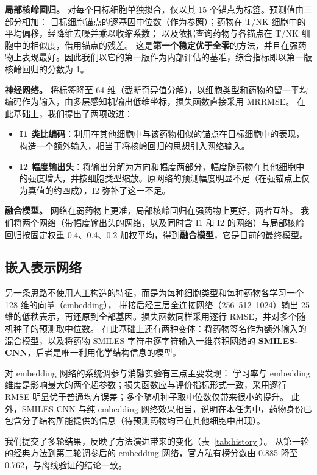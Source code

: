 \documentclass[11pt,a4paper]{article}
\begin{document}
\textbf{局部核岭回归。} 对每个目标细胞单独拟合，仅以其 15 个锚点为标签。预测值由三部分相加：
目标细胞锚点的逐基因中位数（作为参照）；药物在 T/NK 细胞中的平均偏移，经降维去噪并乘以收缩系数；
以及依据查询药物与各锚点在 T/NK 细胞中的相似度，借用锚点的残差。
这是\textbf{第一个稳定优于全零}的方法，并且在强药物上表现最好。因此我们以它的第一版作为内部评估的基准，综合指标即以第一版核岭回归的分数为 1。

\textbf{神经网络。} 将标签降至 64 维（截断奇异值分解），以细胞类型和药物的留一平均编码作为输入，由多层感知机输出低维坐标，损失函数直接采用 MRRMSE。
在此基础上，我们提出了两项改进：
\begin{itemize}
\item \textbf{I1 类比编码}：利用在其他细胞中与该药物相似的锚点在目标细胞中的表现，构造一个额外输入，相当于将核岭回归的思想引入网络输入。
\item \textbf{I2 幅度输出头}：将输出分解为方向和幅度两部分，幅度随药物在其他细胞中的强度增大，并按细胞类型缩放。原网络的预测幅度明显不足（在强锚点上仅为真值的约四成），I2 弥补了这一不足。
\end{itemize}
\textbf{融合模型。} 网络在弱药物上更准，局部核岭回归在强药物上更好，两者互补。
我们将两个网络（带幅度输出头的网络，以及同时含 I1 和 I2 的网络）与局部核岭回归按固定权重 0.4、0.4、0.2 加权平均，得到\textbf{融合模型}，它是目前的最终模型。

\subsection{嵌入表示网络}
另一条思路不使用人工构造的特征，而是为每种细胞类型和每种药物各学习一个 128 维的向量（embedding），
拼接后经三层全连接网络（256--512--1024）输出 25 维的低秩表示，再还原到全部基因。损失函数同样采用逐行 RMSE，并对多个随机种子的预测取中位数。
在此基础上还有两种变体：将药物签名作为额外输入的混合模型，以及将药物 SMILES 字符串逐字符输入一维卷积网络的 \textbf{SMILES-CNN}，后者是唯一利用化学结构信息的模型。

对 embedding 网络的系统调参与消融实验有三点主要发现：
学习率与 embedding 维度是影响最大的两个超参数；损失函数应与评价指标形式一致，采用逐行 RMSE 明显优于普通均方误差；多个随机种子取中位数仅带来很小的提升。
此外，SMILES-CNN 与纯 embedding 网络效果相当，说明在本任务中，药物身份已包含分子结构所能提供的信息（待预测药物均已在其他细胞中出现）。

我们提交了多轮结果，反映了方法演进带来的变化（表~\ref{tab:history}）。
从第一轮的经典方法到第二轮调参后的 embedding 网络，官方私有榜分数由 0.885 降至 0.762，与离线验证的结论一致。
\end{document}
